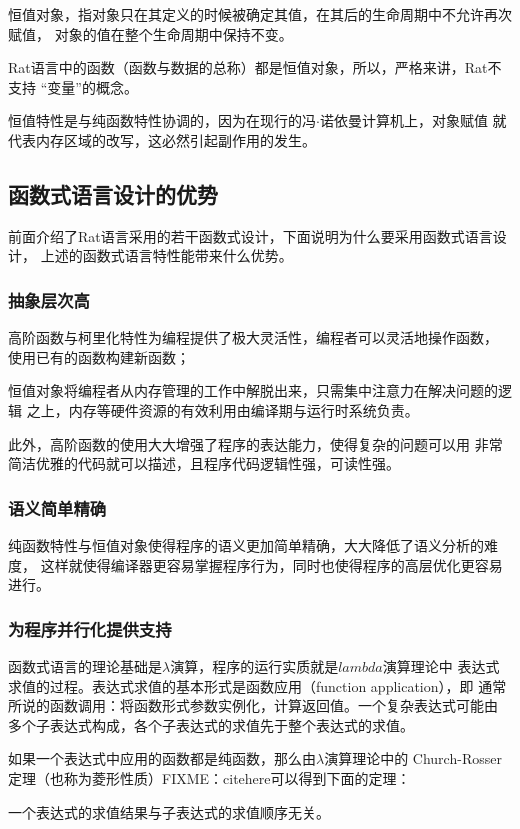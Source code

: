 \begin{definition}
  恒值对象，指对象只在其定义的时候被确定其值，在其后的生命周期中不允许再次赋值，
  对象的值在整个生命周期中保持不变。
\end{definition}

Rat语言中的函数（函数与数据的总称）都是恒值对象，所以，严格来讲，Rat不支持
“变量”的概念。

恒值特性是与纯函数特性协调的，因为在现行的冯$\cdot$诺依曼计算机上，对象赋值
就代表内存区域的改写，这必然引起副作用的发生。

\subsection{函数式语言设计的优势}\label{subsec:functional-advantages}
前面介绍了Rat语言采用的若干函数式设计，下面说明为什么要采用函数式语言设计，
上述的函数式语言特性能带来什么优势。

\subsubsection{抽象层次高}
高阶函数与柯里化特性为编程提供了极大灵活性，编程者可以灵活地操作函数，
使用已有的函数构建新函数；

恒值对象将编程者从内存管理的工作中解脱出来，只需集中注意力在解决问题的逻辑
之上，内存等硬件资源的有效利用由编译期与运行时系统负责。

此外，高阶函数的使用大大增强了程序的表达能力，使得复杂的问题可以用
非常简洁优雅的代码就可以描述，且程序代码逻辑性强，可读性强。

\subsubsection{语义简单精确}
纯函数特性与恒值对象使得程序的语义更加简单精确，大大降低了语义分析的难度，
这样就使得编译器更容易掌握程序行为，同时也使得程序的高层优化更容易进行。

\subsubsection{为程序并行化提供支持}
函数式语言的理论基础是$\lambda$演算，程序的运行实质就是$lambda$演算理论中
表达式求值的过程。表达式求值的基本形式是函数应用（function application），即
通常所说的函数调用：将函数形式参数实例化，计算返回值。一个复杂表达式可能由
多个子表达式构成，各个子表达式的求值先于整个表达式的求值。

如果一个表达式中应用的函数都是纯函数，那么由$\lambda$演算理论中的
Church-Rosser定理（也称为菱形性质）FIXME：citehere可以得到下面的定理：
\begin{theorem}
  一个表达式的求值结果与子表达式的求值顺序无关。
\end{theorem}

